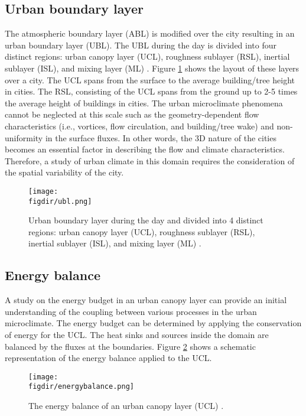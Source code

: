 \subsection{Urban boundary layer}

The atmospheric boundary layer (ABL) is modified over the city resulting in an urban boundary layer (UBL). The UBL during the day is divided into four distinct regions: urban canopy layer (UCL), roughness sublayer (RSL), inertial sublayer (ISL), and mixing layer (ML) \citep{Oke2017a}. Figure \ref{fig:ubl} shows the layout of these layers over a city. The UCL spans from the surface to the average building/tree height in cities. The RSL, consisting of the UCL spans from the ground up to 2-5 times the average height of buildings in cities. The urban microclimate phenomena cannot be neglected at this scale such as the geometry-dependent flow characteristics (i.e., vortices, flow circulation, and building/tree wake) and non-uniformity in the surface fluxes. In other words, the 3D nature of the cities becomes an essential factor in describing the flow and climate characteristics. Therefore, a study of urban climate in this domain requires the consideration of the spatial variability of the city.

	\begin{figure}[t]
		\centering
		\texttt{[image: \\figdir/ubl.png]}
		\caption{Urban boundary layer during the day and divided into 4 distinct regions: urban canopy layer (UCL), roughness sublayer (RSL), inertial sublayer (ISL), and mixing layer (ML) \citep{Oke2017a}.}
		\label{fig:ubl}
	\end{figure}

\subsection{Energy balance}
\label{subsec:energybalance}

A study on the energy budget in an urban canopy layer can provide an initial understanding of the coupling between various processes in the urban microclimate. The energy budget can be determined by applying the conservation of energy for the UCL. The heat sinks and sources inside the domain are balanced by the fluxes at the boundaries. Figure \ref{fig:energybalance} shows a schematic representation of the energy balance applied to the UCL. 

	\begin{figure}[t]
		\centering
		\texttt{[image: \\figdir/energybalance.png]}
		\caption{The energy balance of an urban canopy layer (UCL) \citep{Oke2017a}.}
		\label{fig:energybalance}
	\end{figure}

